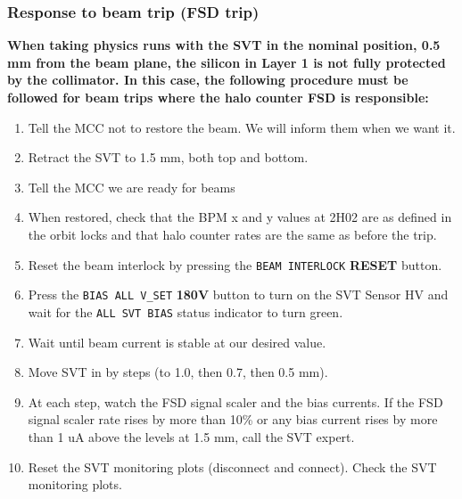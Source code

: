 \documentclass[12pt]{report}
\begin{document}
\subsubsection{Response to beam trip (FSD trip)}
\label{sec:proc_fsd_beamtrip}

\textbf{When taking physics runs with the SVT in  the nominal position, 0.5 mm from the beam plane, the silicon in Layer 1 is not fully protected by the collimator.  In this case, the following procedure must be followed for beam trips where the halo counter FSD is responsible:}
\begin{enumerate}
\item Tell the MCC not to restore the beam. We will inform them when we want it.
\item Retract the SVT to 1.5 mm, both top and bottom.
\item Tell the MCC we are ready for beams
\item When restored, check that the BPM x and y values at 2H02 are as defined in the orbit locks and that halo counter rates are the same as before the trip.
\item Reset the beam interlock by pressing the \texttt{BEAM INTERLOCK} \textbf{RESET} button.
\item Press the \texttt{BIAS ALL V\_SET} \textbf{180V} button to turn on the SVT Sensor HV and wait for the \texttt{ALL SVT BIAS} status indicator to turn green.
\item Wait until beam current is stable at our desired value.
\item Move SVT in by steps (to 1.0, then 0.7, then 0.5 mm). 
\item At each step, watch the FSD signal scaler and the bias currents. If the FSD signal scaler rate rises by more than 10\% or any bias current rises by more than 1 uA above the levels at 1.5 mm, call the SVT expert.
\item Reset the SVT monitoring plots (disconnect and connect). Check the SVT monitoring plots.
\end{enumerate}
\end{document}
